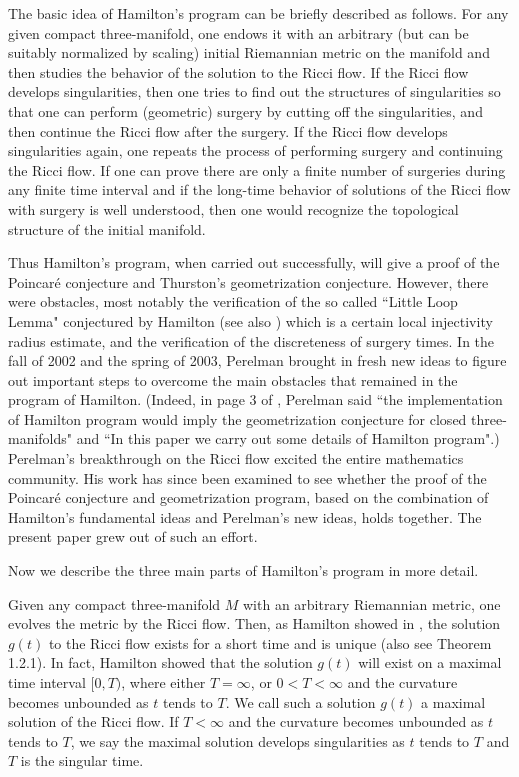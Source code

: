 The basic idea of Hamilton's program can be briefly described as
follows. For any given compact three-manifold, one endows it with
an arbitrary (but can be suitably normalized by scaling) initial
Riemannian metric on the manifold and then studies the behavior of
the solution to the Ricci flow. If the Ricci flow develops
singularities, then one tries to find out the structures of
singularities so that one can perform (geometric) surgery by
cutting off the singularities, and then continue the Ricci flow
after the surgery. If the Ricci flow develops singularities again,
one repeats the process of performing surgery and continuing the
Ricci flow. If one can prove there are only a finite number of
surgeries during any finite time interval and if the long-time
behavior of solutions of the Ricci flow with surgery is well
understood, then one would recognize the topological structure of
the initial manifold.

Thus Hamilton's program, when carried out successfully, will give
a proof of the Poincar\'e conjecture and Thurston's geometrization
conjecture. However, there were obstacles, most notably the
verification of the so called ``Little Loop Lemma" conjectured by
Hamilton \cite{Ha95F} (see also \cite{CCCY}) which is a certain
local injectivity radius estimate, and the verification of the
discreteness of surgery times. In the fall of 2002 and the spring
of 2003, Perelman \cite{P1, P2} brought in fresh new ideas to
figure out important steps to overcome the main obstacles that
remained in the program of Hamilton. (Indeed, in page 3 of
\cite{P1}, Perelman said ``the implementation of Hamilton program
would imply the geometrization conjecture for closed
three-manifolds" and ``In this paper we carry out some details of
Hamilton program".) Perelman's breakthrough on the Ricci flow
excited the entire mathematics community. His work has since been
examined to see whether the proof of the Poincar\'e conjecture and
geometrization program, based on the combination of Hamilton's
fundamental ideas and Perelman's new ideas, holds together. The
present paper grew out of such an effort.


Now we describe the three main parts of Hamilton's program in more
detail.

\vskip 0.1cm 

Given any compact three-manifold $M$ with an arbitrary Riemannian
metric, one evolves the metric by the Ricci flow. Then, as
Hamilton showed in \cite{Ha82}, the solution $g(t)$ to the Ricci
flow exists for a short time and is unique (also see Theorem
1.2.1). In fact, Hamilton \cite{Ha82} showed that the solution
$g(t)$ will exist on a maximal time interval $[0, T)$, where
either $T=\infty$, or $0<T<\infty$ and the curvature becomes
unbounded as $t$ tends to $T$. We call such a solution $g(t)$ a
maximal solution of the Ricci flow. If $T<\infty$ and the
curvature becomes unbounded as $t$ tends to $T$, we say the
maximal solution develops singularities as $t$ tends to $T$ and
$T$ is the singular time.

